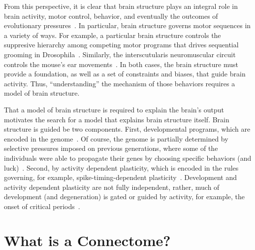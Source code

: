 \documentclass[11pt]{article}
\begin{document}
From this perspective, it is clear that brain structure plays an integral role in brain activity, motor control, behavior, and eventually the outcomes of evolutionary pressures~\cite{Ramon_y_Cajal1995-sf}. 
In particular, brain structure governs motor sequences in a variety of ways.  For example, a particular brain structure controls the suppresive hierarchy among competing motor programs that drives sequential grooming in Drosophila~\cite{Seeds2014-jp}.  
Similarly, the interscutularis neuromuscular circuit  controls the mouse's ear movements~\cite{Lu2009-us}.  
In both cases, the brain structure must provide a foundation, as well as a set of constraints and biases, that guide brain activity.  
Thus, ``understanding'' the mechanism of those behaviors requires a model of brain structure.  

That a model of brain structure is required to explain the brain's output motivates the search for a model that explains brain structure itself.  
Brain structure is guided  be two components.  First, developmental programs, which are encoded in the genome~\cite{Purves1985-lw}.  Of course, the genome is partially determined by selective pressures imposed on previous generations, where some of the individuals were able to propagate their genes by choosing specific behaviors (and luck)~\cite{Tomasetti2015-wl}.  Second, by activity dependent plasticity, which is encoded in the rules governing, for example, spike-timing-dependent plasticity~\cite{Dan2006-lg}. 
Development and activity dependent plasticity are not fully independent, rather, much of development (and degeneration) is gated or guided by activity, for example, the onset of critical periods~\cite{Scott1962-rv}. 


\section{What is a Connectome?}
\end{document}
